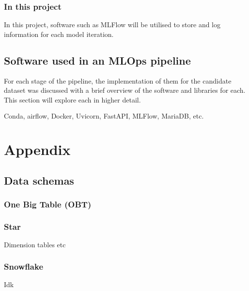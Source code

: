 \documentclass[12pt]{report}
\begin{document}
\subsection{In this project}
In this project, software such as MLFlow will be utilised to store and log information for each model 
iteration. %

\section{Software used in an MLOps pipeline}\label{sec:Software}
For each stage of the pipeline, the implementation of them for the candidate dataset was discussed 
with a brief overview of the software and libraries for each. This section will explore each in 
higher detail. 

Conda, airflow, Docker, Uvicorn, FastAPI, MLFlow, MariaDB, etc.

\chapter{Appendix}
\section{Data schemas}
\subsection{One Big Table (OBT)}

\subsection{Star}
Dimension tables etc
\subsection{Snowflake}
Idk

\printbibliography
\end{document}
